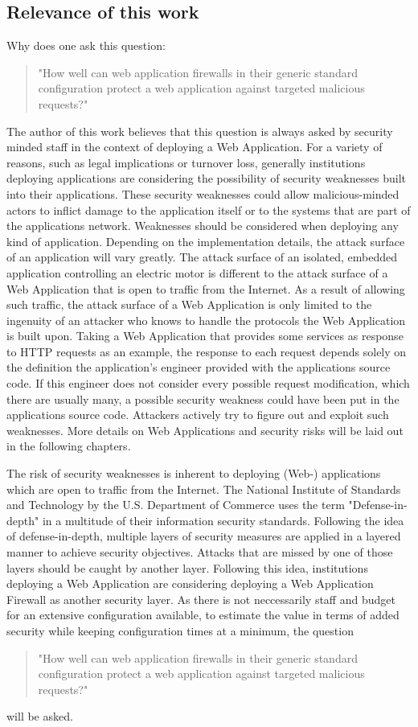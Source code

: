 \subsection{Relevance of this work}
Why does one ask this question:
\begin{quote} "How well can web application firewalls in their generic standard configuration protect a web application against targeted malicious requests?" 
\end{quote}
The author of this work believes that this question is always asked by security minded staff in the context of deploying a Web Application. 
For a variety of reasons, such as legal implications or turnover loss, generally institutions deploying applications are considering the possibility of security weaknesses built into their applications. These security weaknesses could allow malicious-minded actors to inflict damage to the application itself or to the systems that are part of the applications network. Weaknesses should be considered when deploying any kind of application. Depending on the implementation details, the attack surface of an application will vary greatly. The attack surface of an isolated, embedded application controlling an electric motor is different to the attack surface of a Web Application that is open to traffic from the Internet. As a result of allowing such traffic, the attack surface of a Web Application is only limited to the ingenuity of an attacker who knows to handle the protocols the Web Application is built upon. Taking a Web Application that provides some services as response to HTTP requests as an example, the response to each request depends solely on the definition the application's engineer provided with the applications source code. If this engineer does not consider every possible request modification, which there are usually many, a possible security weakness could have been put in the applications source code. Attackers actively try to figure out and exploit such weaknesses. More details on Web Applications and security risks will be laid out in the following chapters.

The risk of security weaknesses is inherent to deploying (Web-) applications which are open to traffic from the Internet. The National Institute of Standards and Technology by the U.S. Department of Commerce uses the term "Defense-in-depth" in a multitude of their information security standards. 
Following the idea of defense-in-depth, multiple layers of security measures are applied in a layered manner to achieve security objectives. Attacks that are missed by one of those layers should be caught by another layer. \cite{nist/did}
Following this idea, institutions deploying a Web Application are considering deploying a Web Application Firewall as another security layer. As there is not neccessarily staff and budget for an extensive configuration available, to estimate the value in terms of added security while keeping configuration times at a minimum, the question
\begin{quote} "How well can web application firewalls in their generic standard configuration protect a web application against targeted malicious requests?" 
\end{quote}
will be asked.

